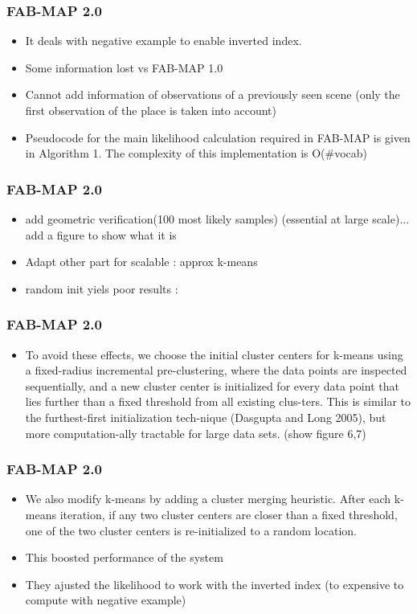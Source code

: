 \begin{frame}
    \frametitle{FAB-MAP 2.0}
    \begin{itemize}
        \item It deals with negative example to enable inverted index.
        \item Some information lost vs FAB-MAP 1.0
        \item Cannot add information of observations of a previously seen scene (only the first observation of the place is taken into account)
        \item Pseudocode for the main likelihood calculation required in FAB-MAP is given in Algorithm 1. The complexity of this implementation is O(\#vocab)
    \end{itemize}
\end{frame}

\begin{frame}
    \frametitle{FAB-MAP 2.0}
    \begin{itemize}
        \item add geometric verification(100 most likely samples) (essential at large scale)... add a figure to show what it is
        \item Adapt other part for scalable : approx k-means
        \item random init yiels poor results :
    \end{itemize}
\end{frame}

\begin{frame}
    \frametitle{FAB-MAP 2.0}
    \begin{itemize}
        \item To avoid these effects, we choose the initial cluster centers for k-means using a fixed-radius incremental pre-clustering, where the data points are inspected sequentially, and a new cluster center is initialized for every data point that lies further than a fixed threshold from all existing clus-ters. This is similar to the furthest-first initialization tech-nique (Dasgupta and Long 2005), but more computation-ally tractable for large data sets. (show figure 6,7)
    \end{itemize}
\end{frame}

\begin{frame}
    \frametitle{FAB-MAP 2.0}
    \begin{itemize}
        \item We also modify k-means by adding a cluster merging heuristic. After each k-means iteration, if any two cluster centers are closer than a fixed threshold, one of the two cluster centers is re-initialized to a random location.
        \item This boosted performance of the system
        \item They ajusted the likelihood to work with the inverted index (to expensive to compute with negative example)
    \end{itemize}
\end{frame}

